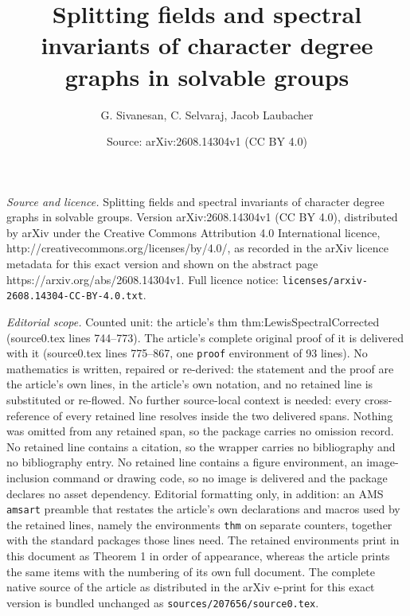 \documentclass[10pt,a4paper]{amsart}
\title{Splitting fields and spectral invariants of character degree graphs in solvable groups}
\author{G. Sivanesan, C. Selvaraj, Jacob Laubacher}
\date{Source: arXiv:2608.14304v1 (CC BY 4.0)}
\begin{document}
\maketitle

\noindent\emph{Source and licence.} Splitting fields and spectral invariants of character degree graphs in solvable groups. Version arXiv:2608.14304v1 (CC BY 4.0), distributed by arXiv under the Creative Commons Attribution 4.0 International licence, http://creativecommons.org/licenses/by/4.0/, as recorded in the arXiv licence metadata for this exact version and shown on the abstract page https://arxiv.org/abs/2608.14304v1. Full licence notice: \texttt{licenses/arxiv-2608.14304-CC-BY-4.0.txt}.\par\smallskip

\noindent\textit{Editorial scope.} Counted unit: the article's thm thm:LewisSpectralCorrected (source0.tex lines 744--773). The article's complete original proof of it is delivered with it (source0.tex lines 775--867, one \texttt{proof} environment of 93 lines). No mathematics is written, repaired or re-derived: the statement and the proof are the article's own lines, in the article's own notation, and no retained line is substituted or re-flowed.  No further source-local context is needed: every cross-reference of every retained line resolves inside the two delivered spans.  Nothing was omitted from any retained span, so the package carries no omission record.  No retained line contains a citation, so the wrapper carries no bibliography and no bibliography entry.  No retained line contains a figure environment, an image-inclusion command or drawing code, so no image is delivered and the package declares no asset dependency.  Editorial formatting only, in addition: an AMS \texttt{amsart} preamble that restates the article's own declarations and macros used by the retained lines, namely the environments \texttt{thm} on separate counters, together with the standard packages those lines need.  The retained environments print in this document as Theorem 1 in order of appearance, whereas the article prints the same items with the numbering of its own full document.  The complete native source of the article as distributed in the arXiv e-print for this exact version is bundled unchanged as \texttt{sources/207656/source0.tex}.
\end{document}
